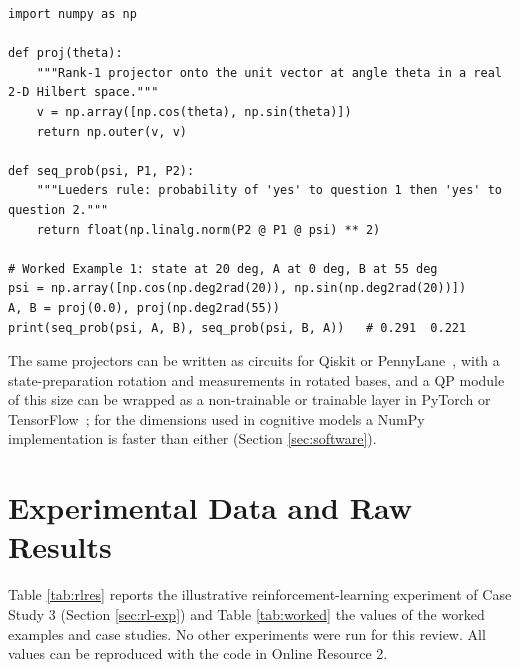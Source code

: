 \documentclass[pdflatex,sn-basic]{sn-jnl}
\begin{document}
\begin{appendices}
\begin{lstlisting}
import numpy as np

def proj(theta):
    """Rank-1 projector onto the unit vector at angle theta in a real 2-D Hilbert space."""
    v = np.array([np.cos(theta), np.sin(theta)])
    return np.outer(v, v)

def seq_prob(psi, P1, P2):
    """Lueders rule: probability of 'yes' to question 1 then 'yes' to question 2."""
    return float(np.linalg.norm(P2 @ P1 @ psi) ** 2)

# Worked Example 1: state at 20 deg, A at 0 deg, B at 55 deg
psi = np.array([np.cos(np.deg2rad(20)), np.sin(np.deg2rad(20))])
A, B = proj(0.0), proj(np.deg2rad(55))
print(seq_prob(psi, A, B), seq_prob(psi, B, A))   # 0.291  0.221
\end{lstlisting}

The same projectors can be written as circuits for Qiskit or PennyLane~\citep{Bergholm2018}, with a state-preparation rotation and measurements in rotated bases, and a QP module of this size can be wrapped as a non-trainable or trainable layer in PyTorch or TensorFlow~\citep{Broughton2020}; for the dimensions used in cognitive models a NumPy implementation is faster than either (Section \ref{sec:software}).


\section{Experimental Data and Raw Results}\label{app:exp}
Table \ref{tab:rlres} reports the illustrative reinforcement-learning experiment of Case Study 3 (Section \ref{sec:rl-exp}) and Table \ref{tab:worked} the values of the worked examples and case studies. No other experiments were run for this review. All values can be reproduced with the code in Online Resource 2.


\end{appendices}
\end{document}
